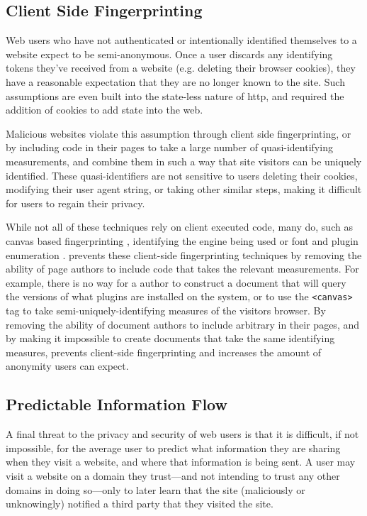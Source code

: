 \subsection{Client Side Fingerprinting}
Web users who have not authenticated or intentionally identified themselves to
a website expect to be semi-anonymous.  Once a user discards any identifying
tokens they've received from a website (e.g. deleting their browser cookies),
they have a reasonable expectation that they are no longer known to the site.
Such assumptions are even built into the state-less nature of \gls{http}, and
required the addition of cookies to add state into the web.

Malicious websites violate this assumption through client side
fingerprinting, or by including \JS code in their pages to
take a large number of quasi-identifying measurements, and combine them
in such a way that site visitors can be uniquely identified.  These
quasi-identifiers are not sensitive to users deleting their cookies,
modifying their user agent string, or taking other similar steps, making it
difficult for users to regain their privacy.

While not all of these techniques rely on client executed \JS
code, many do, such as canvas based fingerprinting
\cite{mowery2012pixel,acar2014web}, identifying the \JS
engine being used\cite{mowery2011fingerprinting} or font and plugin enumeration
\cite{eckersley2010unique}.  \CDF prevents these client-side fingerprinting
techniques by removing the ability of page authors to
include code that takes the relevant measurements.  For
example, there is no way for a \CDF author to construct a \CDF document that
will query the versions of what plugins are installed on the system, or to
use the \texttt{<canvas>} tag to take semi-uniquely-identifying measures of the
visitors browser.  By removing the ability of document authors to include
arbitrary \JS in their pages, and by making it impossible to create
documents that take the same identifying measures, \CDF prevents client-side
fingerprinting and increases the amount of anonymity users can expect.


\subsection{Predictable Information Flow}
\label{sec:eval-info-flow}
A final threat to the privacy and security of web users is that it is difficult,
if not impossible, for the average user to predict what information they are
sharing when they visit a website, and where that information is being sent.
A user may visit a website on a domain they trust---and not intending to trust
any other domains in doing so---only to later learn that the site (maliciously
or unknowingly) notified a third party that they visited the site.

